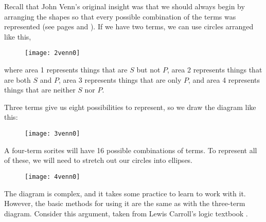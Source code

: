 Recall that John Venn's original insight was that we should always begin by arranging the shapes so that every possible combination of the terms was represented (see pages \pageref{fig:2vennlabels} and \pageref{fig:3vennlabels}). If we have two terms, we can use circles arranged like this,

\begin{figure}[!ht]
\centering
\texttt{[image: 2venn0]}
\end{figure}

\noindent where area 1 represents things that are $S$ but not $P$, area 2 represents things that are both  $S$ and $P$, area 3 represents things that are only $P$, and area 4 represents things that are neither $S$ nor $P$.

Three terms give us eight possibilities to represent, so we draw the diagram like this:

\begin{figure}[!ht]
\centering
\texttt{[image: 3venn0]}
\end{figure}

A four-term sorites will have 16 possible combinations of terms. To represent all of these, we will need to stretch out our circles into ellipses.

\begin{figure}[!ht]
\centering
\texttt{[image: 4venn0]}
\end{figure}

The diagram is complex, and it takes some practice to learn to work with it. However, the basic methods for using it are the same as with the three-term diagram. Consider this argument, taken from Lewis Carroll's logic textbook \cite{Dodgson1896}.

\begin{kormanize}
\end{kormanize}



